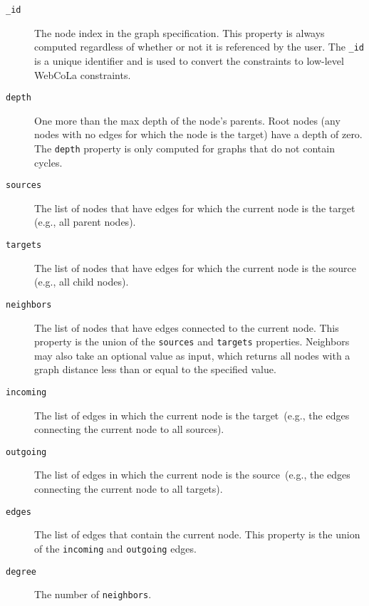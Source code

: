 \begin{description}
\item[\texttt{\_id}] The node index in the graph specification. This
  property is always computed regardless of whether or not it is referenced by the user. The
  \texttt{\_id} is a unique identifier and is used to 
  convert the \projectname constraints to low-level WebCoLa constraints.
\item[\texttt{depth}] One more than the max depth of the node's parents. 
	Root nodes (any nodes with no edges for which the node is the target)
	have a depth of zero. The \texttt{depth} property is only computed for
	graphs that do not contain cycles.
\item[\texttt{sources}] The list of nodes that have edges for which the
	current node is the target (e.g., all parent nodes).
\item[\texttt{targets}] The list of nodes that have edges for which the
	current node is the source (e.g., all child nodes).
\item[\texttt{neighbors}] The list of nodes that have edges connected to
  the current node. This property is the union of the \texttt{sources} and
  \texttt{targets} properties. Neighbors may also take an optional value
  as input, which returns all nodes with a graph distance less than or
  equal to the specified value.
\item[\texttt{incoming}] The list of edges in which the current node is the
	target~(e.g., the edges connecting the current node to all sources).
\item[\texttt{outgoing}] The list of edges in which the current node is the
	source~(e.g., the edges connecting the current node to all targets).
\item[\texttt{edges}] The list of edges that contain the current node. This
	property is the union of the \texttt{incoming} and \texttt{outgoing} edges.
\item[\texttt{degree}] The number of \texttt{neighbors}.
\end{description}
\constraintsFigure



